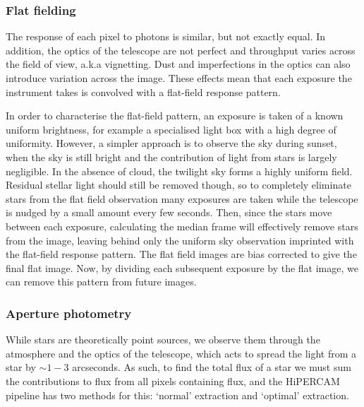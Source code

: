 \subsubsection{Flat fielding}

The response of each pixel to photons is similar, but not exactly equal. In addition, the optics of the telescope are not perfect and throughput varies across the field of view, a.k.a vignetting. Dust and imperfections in the optics can also introduce variation across the image. These effects mean that each exposure the instrument takes is convolved with a flat-field response pattern.

In order to characterise the flat-field pattern, an exposure is taken of a known uniform brightness, for example a specialised light box with a high degree of uniformity. 
However, a simpler approach is to observe the sky during sunset, when the sky is still bright and the contribution of light from stars is largely negligible. In the absence of cloud, the twilight sky forms a highly uniform field.
Residual stellar light should still be removed though, so to completely eliminate stars from the flat field observation many exposures are taken while the telescope is nudged by a small amount every few seconds. Then, since the stars move between each exposure, calculating the median frame will effectively remove stars from the image, leaving behind only the uniform sky observation imprinted with the flat-field response pattern. The flat field images are bias corrected to give the final flat image.
Now, by dividing each subsequent exposure by the flat image, we can remove this pattern from future images. 


\subsubsection{Aperture photometry}

While stars are theoretically point sources, we observe them through the atmosphere and the optics of the telescope, which acts to spread the light from a star by $\sim 1-3$ arcseconds. As such, to find the total flux of a star we must sum the contributions to flux from all pixels containing flux, and the HiPERCAM pipeline has two methods for this: `normal' extraction and `optimal' extraction.

